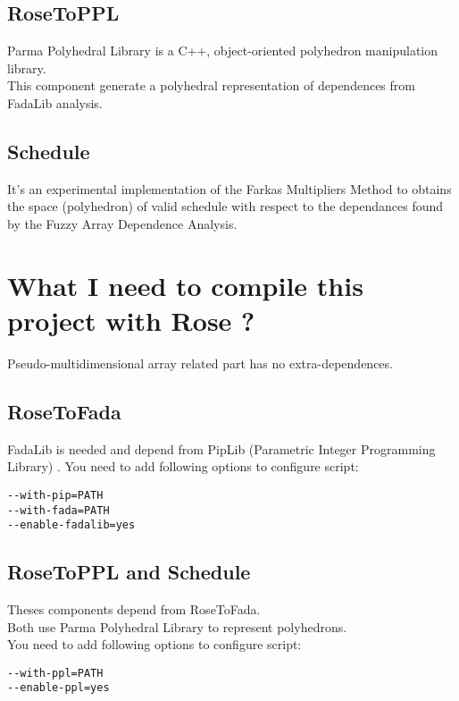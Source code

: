 		\subsection{RoseToPPL}
		
	Parma Polyhedral Library \cite{PPL} is a C++, object-oriented polyhedron manipulation library.\\
	This component generate a polyhedral representation of dependences from FadaLib analysis.
	
		\subsection{Schedule}
		
	It's an experimental implementation of the Farkas Multipliers Method to obtains the space (polyhedron) of 
valid schedule with respect to the dependances found by the Fuzzy Array Dependence Analysis.

	\section{What I need to compile this project with Rose ?}

	Pseudo-multidimensional array related part has no extra-dependences.
	
	\subsection{RoseToFada}
	
		FadaLib \cite{FADAweb} is needed and depend from PipLib (Parametric Integer Programming Library)
\cite{PIP}.
		You need to add following options to configure script:
\begin{verbatim}
--with-pip=PATH
--with-fada=PATH
--enable-fadalib=yes
\end{verbatim}
	
	\subsection{RoseToPPL and Schedule}

		Theses components depend from RoseToFada.\\
		Both use Parma Polyhedral Library \cite{PPL} to represent polyhedrons.\\
		You need to add following options to configure script:
\begin{verbatim}
--with-ppl=PATH
--enable-ppl=yes
\end{verbatim}
		

